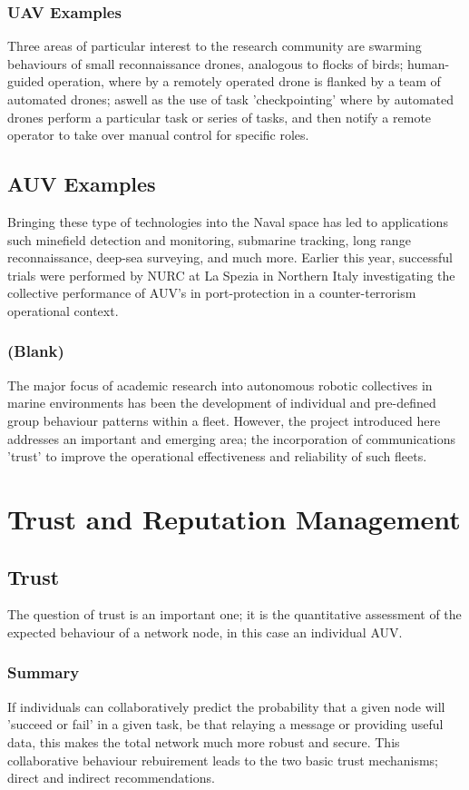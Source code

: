 \documentclass[oneside,11pt,a4paper]{Latex/Classes/PhDthesisPSnPDF}
\begin{document}
\begin{doublespace}
\subsubsection{UAV Examples}  Three areas of particular interest to the research
community are swarming behaviours of small reconnaissance drones, analogous to
flocks of birds; human-guided operation, where by a remotely operated drone is 
flanked by a team of automated drones; aswell as the use of task 'checkpointing'
where by automated drones perform a particular task or series of tasks, and 
then notify a remote operator to take over manual control for specific roles.

\subsection{AUV Examples}  Bringing these type of technologies into the Naval
space has led to applications such minefield detection and monitoring, submarine tracking,
long range reconnaissance, deep-sea surveying, and much more. Earlier this year,
successful trials were performed by NURC at La Spezia in Northern Italy
investigating the collective performance of AUV's in port-protection in a
counter-terrorism operational context.

\subsubsection{(Blank)} The major focus of academic research into autonomous
robotic collectives in marine environments has been the development of
individual and pre-defined group behaviour patterns within a fleet. However,
the project introduced here addresses an important and emerging area; the
incorporation of communications 'trust' to improve the operational effectiveness
and reliability of such fleets.

\section{Trust and Reputation Management}
\subsection{Trust}  The question of trust is an important one; it is the quantitative
assessment of the expected behaviour of a network node, in this case an
individual AUV. 

\subsubsection{Summary} 
If individuals can collaboratively predict
the probability that a given node will 'succeed or fail' in a given task, be that relaying a message
or providing useful data, this makes the total network much more robust and
secure. This collaborative behaviour rebuirement leads to the two basic trust
mechanisms; direct and indirect recommendations. 

\end{doublespace}
\end{document}
